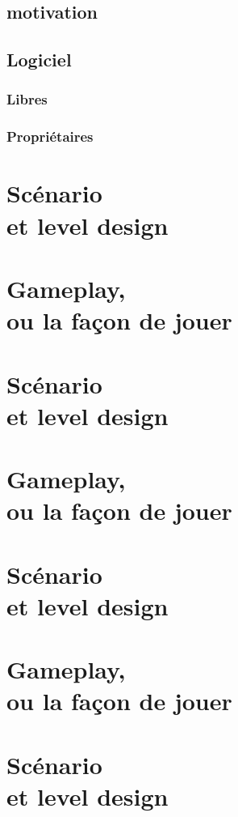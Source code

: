 \documentclass[a4paper, 10pt, oneside, fleqn]{report}
\begin{document}
	\section{motivation}
	\section{Logiciel}
	\subsection{Libres}
	\subsection{Propriétaires}
	
	\chapter[Scénarioet level design]{Scénario\\et level design}	
	
	\chapter[Gameplay, ou la façon de jouer]{Gameplay,\\ou la façon de jouer}
	
	\chapter[Scénario et level design]{Scénario\\et level design}

	\chapter[Gameplay, ou la façon de jouer]{Gameplay,\\ou la façon de jouer}
	
	\chapter[Scénario et level design]{Scénario\\et level design}
	
	\chapter[Gameplay, ou la façon de jouer]{Gameplay,\\ou la façon de jouer}
	
	\chapter[Scénario et level design]{Scénario\\et level design} 
\end{document}
